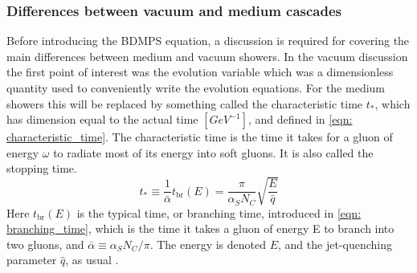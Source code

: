 \documentclass[main.tex]{subfiles}
\begin{document}
\subsubsection*{Differences between vacuum and medium cascades}
Before introducing the BDMPS equation, a discussion is required for covering the main differences between medium and vacuum showers. In the vacuum discussion the first point of interest was the evolution variable which was a dimensionless quantity used to conveniently write the evolution equations. For the medium showers this will be replaced by something called the characteristic time \(t_*\), which has dimension equal to the actual time \([GeV^{-1}]\), and defined in \autoref{eqn: characteristic_time}. The characteristic time is the time it takes for a gluon of energy \(\omega\) to radiate most of its energy into soft gluons. It is also called the stopping time.
\begin{equation}\label{eqn: characteristic_time}
    t_* \equiv \frac{1}{\bar \alpha} t_{\text{br}}(E) = \frac{\pi}{\alpha_S N_C} \sqrt{\frac{E}{\hat q}}
\end{equation}
Here \(t_{\text{br}}(E)\) is the typical time, or branching time, introduced in \autoref{eqn: branching_time}, which is the time it takes a gluon of energy E to branch into two gluons, and \(\bar \alpha \equiv \alpha_S N_C / \pi\). The energy is denoted \(E\), and the jet-quenching parameter \(\hat q\), as usual . 
\end{document}
